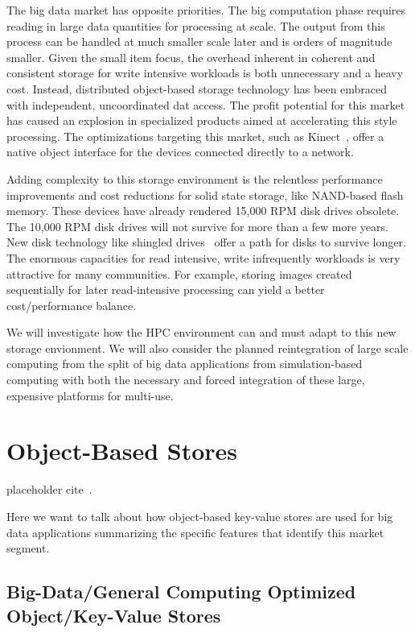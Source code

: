 The big data market has opposite priorities. The big computation phase requires
reading in large data quantities for processing at scale. The output from this
process can be handled at much smaller scale later and is orders of magnitude
smaller. Given the small item focus, the overhead inherent in coherent and
consistent storage for write intensive workloads is both unnecessary and a
heavy cost. Instead, distributed object-based storage technology has been
embraced with independent, uncoordinated dat access. The profit potential for
this market has caused an explosion in specialized products aimed at
accelerating this style processing.  The optimizations targeting this market,
such as Kinect~\cite{segate:kinect}, offer a native object interface for the
devices connected directly to a network.

Adding complexity to this storage environment is the relentless performance
improvements and cost reductions for solid state storage, like NAND-based flash
memory. These devices have already rendered 15,000 RPM disk drives obsolete.
The 10,000 RPM disk drives will not survive for more than a few more years.
New disk technology like shingled drives~\cite{shingled-media} offer a path for
disks to survive longer. The enormous capacities for read intensive, write
infrequently workloads is very attractive for many communities. For example,
storing images created sequentially for later read-intensive processing can
yield a better cost/performance balance.

We will investigate how the HPC environment can and must adapt to this new
storage envionment. We will also consider the planned reintegration of large
scale computing from the split of big data applications from simulation-based
computing with both the necessary and forced integration of these large,
expensive platforms for multi-use.

\section{Object-Based Stores}\label{sec:intro}
placeholder cite~\cite{ilyas2004hsn}.

Here we want to talk about how object-based key-value stores are used for big
data applications summarizing the specific features that identify this market
segment.

\subsection{Big-Data/General Computing Optimized Object/Key-Value Stores}


